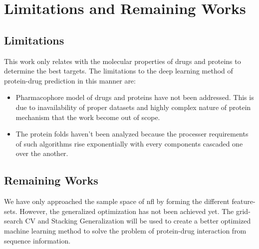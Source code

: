 \chapter{Limitations and Remaining Works }

\section{Limitations}
This work only relates with the molecular properties of drugs and proteins to determine the best targets. The limitations to the deep learning method of protein-drug prediction in this manner are:
\begin{itemize}
    \item Pharmacophore model of drugs and proteins have not been addressed. This is due to inavailability of proper datasets and highly complex nature of protein mechanism that the work become out of scope.
    \item The protein folds haven't been analyzed because the processer requirements of such algorithms rise exponentially with every components cascaded one over the another.
\end{itemize}

\section{Remaining Works}
We have only approached the sample space of \acrfull{nfl} by forming the different feature-sets. However, the generalized optimization has not been achieved yet. The grid-search CV and Stacking Generalization will be used to create a better optimized machine learning method to solve the problem of protein-drug interaction from sequence information.

\iffalse
\section{Future Work}
The future works can be listed as below:
\begin{itemize}
    \item The molecular dockings of drugs with proteins should be analysed using the contact maps of proteins to properly.
    \item The pharmacological model to identify safe drugs for treating diseases need to assessed.
    \item Molecular dynamics should be related to drugs factor when determining the druggability of proteins.
\end{itemize}
\fi

